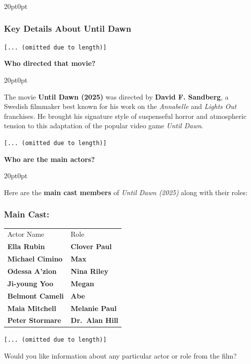\documentclass[fleqn,moreauthors,10pt]{ds_report}
\begin{document}
\begin{appendix}
\begin{tcolorbox}[breakable,float*,width=\textwidth,title=Conversation Example with Advanced Qwen]
\begin{adjustwidth}{20pt}{0pt}
\subsubsection*{Key Details About Until Dawn}

\texttt{[... (omitted due to length)]} \\

\end{adjustwidth}

\textbf{Who directed that movie?}

\begin{adjustwidth}{20pt}{0pt}

The movie \textbf{Until Dawn (2025)} was directed by \textbf{David F.
Sandberg}, a Swedish filmmaker best known for his work on the
\emph{Annabelle} and \emph{Lights Out} franchises. He brought his
signature style of suspenseful horror and atmospheric tension to this
adaptation of the popular video game \emph{Until Dawn}.

\texttt{[... (omitted due to length)]} \\

\end{adjustwidth}

\textbf{Who are the main actors?}

\begin{adjustwidth}{20pt}{0pt}

Here are the \textbf{main cast members} of \emph{Until Dawn (2025)}
along with their roles:

\subsubsection*{Main Cast:}

\begin{tabular}{ l l }
	Actor Name & Role \\
	\textbf{Ella Rubin} & \textbf{Clover Paul} \\
	\textbf{Michael Cimino} & \textbf{Max} \\
	\textbf{Odessa A'zion} & \textbf{Nina Riley} \\
	\textbf{Ji-young Yoo} & \textbf{Megan} \\
	\textbf{Belmont Cameli} & \textbf{Abe} \\
	\textbf{Maia Mitchell} & \textbf{Melanie Paul} \\
	\textbf{Peter Stormare} & \textbf{Dr.~Alan Hill} \\
\end{tabular}

\texttt{[... (omitted due to length)]} 

Would you like information about any particular actor or role from the
film?

\end{adjustwidth}

\end{tcolorbox}


\end{appendix}
\end{document}
